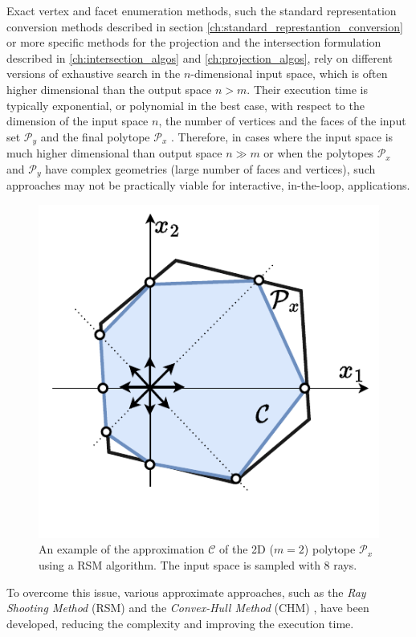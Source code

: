 Exact vertex and facet enumeration methods, such the standard representation conversion methods described in section \ref{ch:standard_represtantion_conversion} or more specific methods for the projection and the intersection formulation described in \ref{ch:intersection_algos} and \ref{ch:projection_algos}, rely on different versions of exhaustive search in the $n$-dimensional input space, which is often higher dimensional than the output space $n> m$. Their execution time is typically exponential, or polynomial in the best case, with respect to the dimension of the input space $n$, the number of vertices and the faces of the input set $\mathcal{P}_y$ and the final polytope $\mathcal{P}_x$ \cite{Dyer1983}. Therefore, in cases where the input space is much higher dimensional than output space $n\gg m$ or when the polytopes $\mathcal{P}_x$ and $\mathcal{P}_y$ have complex geometries (large number of faces and vertices), such approaches may not be practically viable for interactive, in-the-loop, applications. 

\begin{figure}
    \centering
    \includegraphics[width=\linewidth]{Papers/images/rsm.pdf}
    \caption{An example of the approximation $\mathcal{C}$ of the 2D ($m\!=\!2$) polytope $\mathcal{P}_x$ using a RSM algorithm. The input space is sampled with 8 rays. }
    \label{fig:rsm}
\end{figure}
To overcome this issue, various approximate approaches, such as the  \textit{Ray Shooting Method} (RSM)  \cite{agarwal1993ray} and the \textit{Convex-Hull Method} (CHM) \cite{lassez1992quantifier}, have been developed, reducing the complexity and improving the execution time. 


